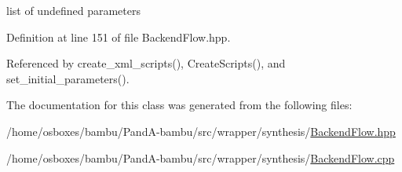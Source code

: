 list of undefined parameters 



Definition at line 151 of file Backend\+Flow.\+hpp.



Referenced by create\+\_\+xml\+\_\+scripts(), Create\+Scripts(), and set\+\_\+initial\+\_\+parameters().



The documentation for this class was generated from the following files\+:\begin{DoxyCompactItemize}
\item 
/home/osboxes/bambu/\+Pand\+A-\/bambu/src/wrapper/synthesis/\hyperlink{BackendFlow_8hpp}{Backend\+Flow.\+hpp}\item 
/home/osboxes/bambu/\+Pand\+A-\/bambu/src/wrapper/synthesis/\hyperlink{BackendFlow_8cpp}{Backend\+Flow.\+cpp}\end{DoxyCompactItemize}
